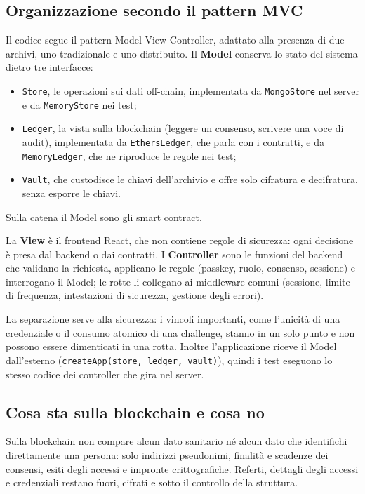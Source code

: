 \subsection{Organizzazione secondo il pattern MVC}
Il codice segue il pattern Model-View-Controller, adattato alla presenza di due archivi, uno tradizionale e uno distribuito. Il \textbf{Model} conserva lo stato del sistema dietro tre interfacce:
\begin{itemize}
  \item \texttt{Store}, le operazioni sui dati off-chain, implementata da \texttt{MongoStore} nel server e da \texttt{MemoryStore} nei test;
  \item \texttt{Ledger}, la vista sulla blockchain (leggere un consenso, scrivere una voce di audit), implementata da \texttt{EthersLedger}, che parla con i contratti, e da \texttt{MemoryLedger}, che ne riproduce le regole nei test;
  \item \texttt{Vault}, che custodisce le chiavi dell'archivio e offre solo cifratura e decifratura, senza esporre le chiavi.
\end{itemize}
Sulla catena il Model sono gli smart contract.

La \textbf{View} è il frontend React, che non contiene regole di sicurezza: ogni decisione è presa dal backend o dai contratti. I \textbf{Controller} sono le funzioni del backend che validano la richiesta, applicano le regole (passkey, ruolo, consenso, sessione) e interrogano il Model; le rotte li collegano ai middleware comuni (sessione, limite di frequenza, intestazioni di sicurezza, gestione degli errori).

La separazione serve alla sicurezza: i vincoli importanti, come l'unicità di una credenziale o il consumo atomico di una challenge, stanno in un solo punto e non possono essere dimenticati in una rotta. Inoltre l'applicazione riceve il Model dall'esterno (\texttt{createApp(store, ledger, vault)}), quindi i test eseguono lo stesso codice dei controller che gira nel server.

\subsection{Cosa sta sulla blockchain e cosa no}
Sulla blockchain non compare alcun dato sanitario né alcun dato che identifichi direttamente una persona: solo indirizzi pseudonimi, finalità e scadenze dei consensi, esiti degli accessi e impronte crittografiche. Referti, dettagli degli accessi e credenziali restano fuori, cifrati e sotto il controllo della struttura.

